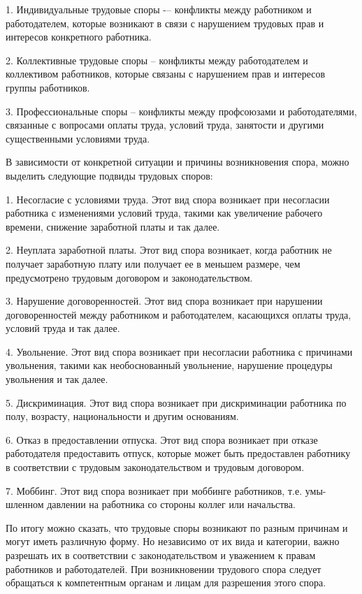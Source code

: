 1. Индивидуальные трудовые споры -– конфликты между работником и работодателем, 
которые возникают в связи с нарушением трудовых прав и интересов конкретного работника.

2. Коллективные трудовые споры -- конфликты между работодателем и коллективом работников, которые связаны с нарушением прав и интересов группы работников.

3. Профессиональные споры -- конфликты между профсоюзами и работодателями, связанные с вопросами оплаты труда, условий труда, занятости и другими существенными условиями труда.

В зависимости от конкретной ситуации и причины возникновения спора, можно выделить следующие подвиды трудовых споров:

1. Несогласие с условиями труда. Этот вид спора возникает при несогласии работника с изменениями условий труда, такими как увеличение рабочего времени, снижение заработной платы и так далее.

2. Неуплата заработной платы. Этот вид спора возникает, когда работник не получает заработную плату или получает ее в меньшем размере, чем предусмотрено трудовым договором и законодательством.

3. Нарушение договоренностей. Этот вид спора возникает при нарушении договоренностей между работником и работодателем, касающихся оплаты труда, условий труда и так далее.

4. Увольнение. Этот вид спора возникает при несогласии работника с причинами увольнения, такими как необоснованный увольнение, нарушение процедуры увольнения и так далее.

5. Дискриминация. Этот вид спора возникает при дискриминации работника по полу, возрасту, национальности и другим основаниям.

6. Отказ в предоставлении отпуска. Этот вид спора возникает при отказе работодателя предоставить отпуск, которые может быть предоставлен работнику в соответствии с трудовым законодательством и трудовым договором.

7. Моббинг. Этот вид спора возникает при моббинге работников, т.е. умы-шленном давлении на работника со стороны коллег или начальства.

По итогу можно сказать, что трудовые споры возникают по разным причинам и могут иметь различную форму. Но независимо от их вида и категории, важно разрешать их в соответствии с законодательством и уважением к правам работников и работодателей. При возникновении трудового спора следует обращаться к компетентным органам и лицам для разрешения этого спора.


